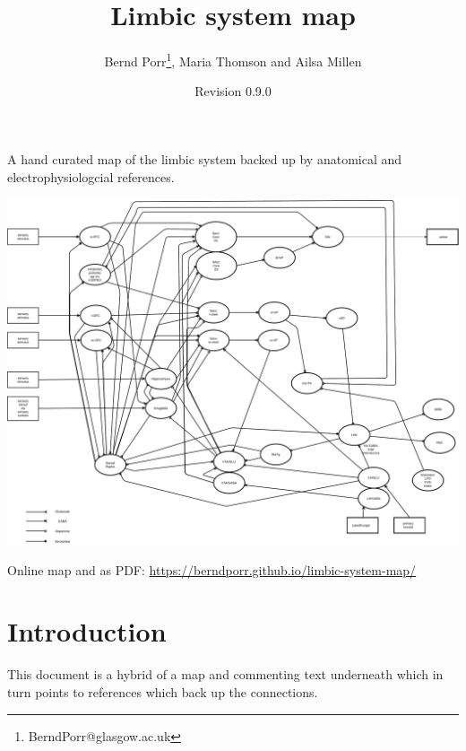 \documentclass[12pt,a4paper]{article}
\title{Limbic system map}
\author{Bernd Porr\footnote{BerndPorr@glasgow.ac.uk}, Maria Thomson and Ailsa Millen}
\date{Revision 0.9.0}
\begin{document}
\maketitle

\begin{center}
  A hand curated map of the limbic system backed up by anatomical and
  electrophysiologcial references.
\end{center}

\begin{latexonly}
  \begin{center}
    \includegraphics[width=\textwidth]{limbic-map}
  \end{center}
\end{latexonly}

  {\footnotesize Online map and as PDF: \url{https://berndporr.github.io/limbic-system-map/}}

\clearpage

\tableofcontents

\section{Introduction}
This document is a hybrid of a map and commenting text
underneath which in turn points to references which back up the
connections.
\end{document}
